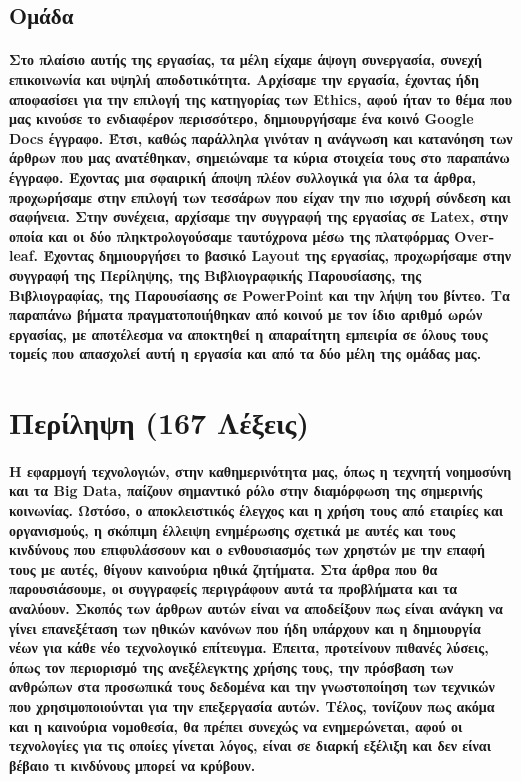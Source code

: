 \documentclass[12pt, A4]{article}
\newcommand{\tl}{\textlatin}
\begin{document}
    \subsection{Ομάδα}
        \paragraph{Στο πλαίσιο αυτής της εργασίας, τα μέλη είχαμε άψογη συνεργασία, συνεχή επικοινωνία και υψηλή αποδοτικότητα. Αρχίσαμε την εργασία, έχοντας ήδη αποφασίσει για την επιλογή της κατηγορίας των \tl{Ethics}, αφού ήταν το θέμα που μας κινούσε το ενδιαφέρον περισσότερο, δημιουργήσαμε ένα κοινό \tl{Google Docs} έγγραφο. Έτσι, καθώς παράλληλα γινόταν η ανάγνωση και κατανόηση των άρθρων που μας ανατέθηκαν, σημειώναμε τα κύρια στοιχεία τους στο παραπάνω έγγραφο. Έχοντας μια σφαιρική άποψη πλέον συλλογικά για όλα τα άρθρα, προχωρήσαμε στην επιλογή των τεσσάρων που είχαν την πιο ισχυρή σύνδεση και σαφήνεια. Στην συνέχεια, αρχίσαμε την συγγραφή της εργασίας σε \tl{Latex}, στην οποία και οι δύο πληκτρολογούσαμε ταυτόχρονα μέσω της πλατφόρμας \tl{Overleaf}. Έχοντας δημιουργήσει το βασικό \tl{Layout} της εργασίας, προχωρήσαμε στην συγγραφή της Περίληψης, της Βιβλιογραφικής Παρουσίασης, της Βιβλιογραφίας, της Παρουσίασης σε \tl{PowerPoint} και την λήψη του βίντεο. Τα παραπάνω βήματα πραγματοποιήθηκαν από κοινού με τον ίδιο αριθμό ωρών εργασίας, με αποτέλεσμα να αποκτηθεί η απαραίτητη εμπειρία σε όλους τους τομείς που απασχολεί αυτή η εργασία και από τα δύο μέλη της ομάδας μας.}
    \newpage

    \section{Περίληψη (167 Λέξεις)}
    \paragraph{Η εφαρμογή τεχνολογιών, στην καθημερινότητα μας, όπως η τεχνητή νοημοσύνη και τα \tl{Big Data}, παίζουν σημαντικό ρόλο στην διαμόρφωση της σημερινής κοινωνίας. Ωστόσο, ο αποκλειστικός έλεγχος και η χρήση τους από εταιρίες και οργανισμούς, η σκόπιμη έλλειψη ενημέρωσης σχετικά με αυτές και τους κινδύνους που επιφυλάσσουν και ο ενθουσιασμός των χρηστών με την επαφή τους με αυτές, θίγουν καινούρια ηθικά ζητήματα. Στα άρθρα που θα παρουσιάσουμε, οι συγγραφείς περιγράφουν αυτά τα προβλήματα και τα αναλύουν. Σκοπός των άρθρων αυτών είναι να αποδείξουν πως είναι ανάγκη να γίνει επανεξέταση των ηθικών κανόνων που ήδη υπάρχουν και η δημιουργία νέων για κάθε νέο τεχνολογικό επίτευγμα. Έπειτα, προτείνουν πιθανές λύσεις, όπως τον περιορισμό της ανεξέλεγκτης χρήσης τους, την πρόσβαση των ανθρώπων στα προσωπικά τους δεδομένα και την γνωστοποίηση των τεχνικών που χρησιμοποιούνται για την επεξεργασία αυτών. Τέλος, τονίζουν πως ακόμα και η καινούρια νομοθεσία, θα πρέπει συνεχώς να ενημερώνεται, αφού οι τεχνολογίες για τις οποίες γίνεται λόγος, είναι σε διαρκή εξέλιξη και δεν είναι βέβαιο τι κινδύνους μπορεί να κρύβουν.}
    \newpage
\end{document}

